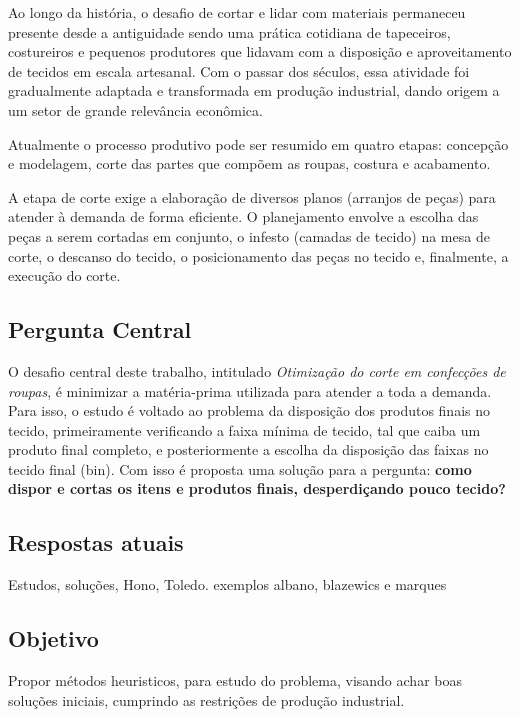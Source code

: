 \documentclass[a4paper, 12pt]{article}
\begin{document}
Ao longo da história, o desafio de cortar e lidar com materiais permaneceu presente desde a antiguidade sendo uma prática cotidiana de tapeceiros, costureiros e pequenos produtores que lidavam com a disposição e aproveitamento de tecidos em escala artesanal. Com o passar dos séculos, essa atividade foi gradualmente adaptada e transformada em produção industrial, dando origem a um setor de grande relevância econômica. 

Atualmente o processo produtivo pode ser resumido em quatro etapas: concepção e modelagem, corte das partes que compõem as roupas, costura e acabamento. 

A etapa de corte exige a elaboração de diversos planos (arranjos de peças) para atender à demanda de forma eficiente. O planejamento envolve a escolha das peças a serem cortadas em conjunto, o infesto (camadas de tecido) na mesa de corte, o descanso do tecido, o posicionamento das peças no tecido e, finalmente, a execução do corte.

\subsection{Pergunta Central}

O desafio central deste trabalho, intitulado \textit{Otimização do corte em confecções de roupas}, é minimizar a matéria-prima utilizada para atender a toda a demanda. Para isso, o estudo é voltado ao problema da disposição dos produtos finais no tecido, primeiramente verificando a faixa mínima de tecido, tal que caiba um produto final completo, e posteriormente a escolha da disposição das faixas no tecido final (bin). Com isso é proposta uma solução para a pergunta: \textbf{como dispor e cortas os itens e produtos finais, desperdiçando pouco tecido?}

\subsection{Respostas atuais}
Estudos, soluções, Hono, Toledo. exemplos albano, blazewics e marques

\subsection{Objetivo}

Propor métodos heuristicos, para estudo do problema, visando achar boas soluções iniciais, cumprindo as restrições de produção industrial.
\end{document}
